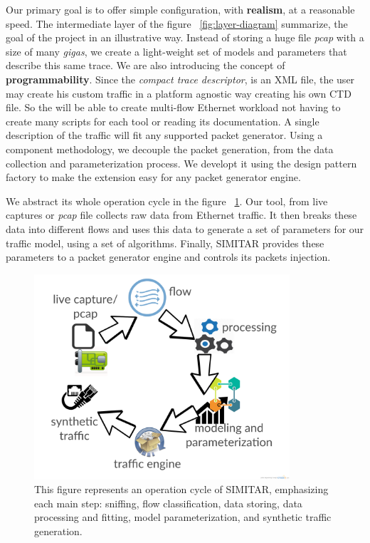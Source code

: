Our primary goal is to offer simple configuration, with \textbf{realism}, at a reasonable speed. The intermediate layer of the figure ~\ref{fig:layer-diagram} summarize, the goal of the project in an illustrative way. Instead of storing a huge file \textit{pcap} with a size of many \textit{gigas}, we create a light-weight set of models and parameters that describe this same trace. We are also introducing the concept of \textbf{programmability}. Since the \textit{compact trace descriptor},  is an XML file, the user may create his custom traffic in a platform agnostic way creating his own CTD file. So the will be able to create multi-flow Ethernet workload not having to create many scripts for each tool or reading its documentation. A single description of the traffic will fit any supported packet generator. Using a component methodology, we decouple the packet generation, from the data collection and parameterization process. We developt it using the design pattern factory to make the extension easy for any packet generator engine. 


We abstract its whole operation cycle in the figure ~\ref{fig:cycle-of-operation}. Our tool, from live captures or \textit{pcap} file collects raw data from Ethernet traffic. It then breaks these data into different flows and uses this data to generate a set of parameters for our traffic model, using a set of algorithms. Finally, SIMITAR provides these parameters to a packet generator engine and controls its packets injection.

\begin{figure}[ht!]
        \centering
        \includegraphics[height=3.0in]{figures/ch3/digram-project-cycle}
        \caption{This figure represents an operation cycle of SIMITAR, emphasizing each main step: sniffing, flow classification, data storing, data processing and fitting, model parameterization,  and synthetic traffic generation.}
    \label{fig:cycle-of-operation}
\end{figure}


